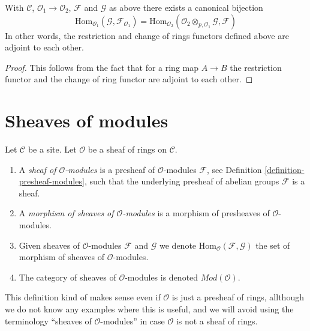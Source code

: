 \begin{lemma}
\label{lemma-adjointness-tensor-restrict-presheaves}
With $\mathcal{C}$, $\mathcal{O}_1 \to \mathcal{O}_2$, $\mathcal{F}$ and
$\mathcal{G}$ as above there exists a canonical bijection
$$
\text{Hom}_{\mathcal{O}_1}(\mathcal{G}, \mathcal{F}_{\mathcal{O}_1})
=
\text{Hom}_{\mathcal{O}_2}(
\mathcal{O}_2 \otimes_{p, \mathcal{O}_1} \mathcal{G},
\mathcal{F}
)
$$
In other words, the restriction and change of rings functors defined
above are adjoint to each other.
\end{lemma}

\begin{proof}
This follows from the fact that for a ring map
$A \to B$ the restriction functor and the change
of ring functor are adjoint to each other.
\end{proof}


\section{Sheaves of modules}
\label{section-sheaves-modules}

\begin{definition}
\label{definition-sheaf-modules}
Let $\mathcal{C}$ be a site.
Let $\mathcal{O}$ be a sheaf of rings on $\mathcal{C}$.
\begin{enumerate}
\item A {\it sheaf of $\mathcal{O}$-modules} is a presheaf
of $\mathcal{O}$-modules $\mathcal{F}$,
see Definition \ref{definition-presheaf-modules},
such that the underlying presheaf of abelian groups $\mathcal{F}$
is a sheaf.
\item A {\it morphism of sheaves of $\mathcal{O}$-modules}
is a morphism of presheaves of $\mathcal{O}$-modules.
\item Given sheaves of $\mathcal{O}$-modules
$\mathcal{F}$ and $\mathcal{G}$ we denote
$\text{Hom}_{\mathcal{O}}(\mathcal{F}, \mathcal{G})$
the set of morphism of sheaves of $\mathcal{O}$-modules.
\item The category of sheaves of $\mathcal{O}$-modules
is denoted $\textit{Mod}(\mathcal{O})$.
\end{enumerate}
\end{definition}

\noindent
This definition kind of makes sense even if $\mathcal{O}$ is just a
presheaf of rings, allthough we do not know any examples where
this is useful, and we will avoid using the terminology
``sheaves of $\mathcal{O}$-modules''
in case $\mathcal{O}$ is not a sheaf of rings.



